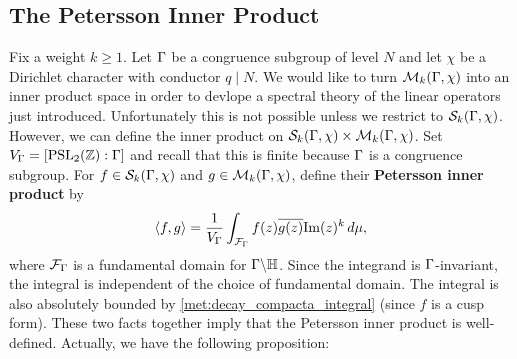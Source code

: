     \subsection*{The Petersson Inner Product}
      Fix a weight $k \ge 1$. Let $\Gamma$ be a congruence subgroup of level $N$ and let $\chi$ be a Dirichlet character with conductor $q \mid N$. We would like to turn $\mathcal{M}_{k}(\Gamma,\chi)$ into an inner product space in order to devlope a spectral theory of the linear operators just introduced. Unfortunately this is not possible unless we restrict to $\mathcal{S}_{k}(\Gamma,\chi)$. However, we can define the inner product on $\mathcal{S}_{k}(\Gamma,\chi) \times \mathcal{M}_{k}(\Gamma,\chi)$. Set $V_{\Gamma} = [\mathrm{PSL}_{2}(\mathbb{Z}):\Gamma]$ and recall that this is finite because $\Gamma$ is a congruence subgroup. For $f \in \mathcal{S}_{k}(\Gamma,\chi)$ and $g \in \mathcal{M}_{k}(\Gamma,\chi)$, define their \textbf{Petersson inner product} by
      \[
        \langle f,g\rangle = \frac{1}{V_{\Gamma}}\int_{\mathcal{F}_{\Gamma}}f(z)\overline{g(z)}\mathrm{Im}(z)^{k}\,d\mu,
      \]
      where $\mathcal{F}_{\Gamma}$ is a fundamental domain for $\Gamma\backslash\mathbb{H}$. Since the integrand is $\Gamma$-invariant, the integral is independent of the choice of fundamental domain. The integral is also absolutely bounded by \cref{met:decay_compacta_integral} (since $f$ is a cusp form). These two facts together imply that the Petersson inner product is well-defined. Actually, we have the following proposition:

